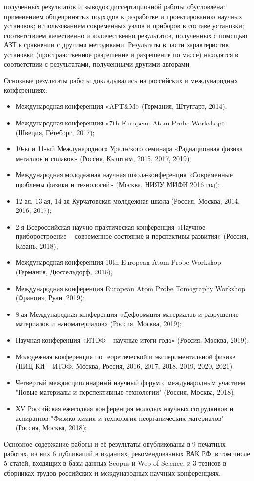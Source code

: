 {\reliability} полученных результатов и выводов диссертационной работы обусловлена: применением общепринятых подходов к разработке и проектированию научных установок; использованием современных узлов и приборов в составе установки; соответствием качественно и количественно результатов, полученных с помощью АЗТ в сравнении с другими методиками. Результаты в части характеристик установки (пространственное разрешение и разрешение по массе) находятся в соответствии с результатами, полученными другими авторами.


{\probation}
Основные результаты работы докладывались на российских и международных конференциях:
\begin{itemize}
	\item Международная конференция «APT$\&$M» (Германия, Штутгарт, 2014);
	\item Международная конференция «7th European Atom Probe Workshop» (Швеция, Гётеборг, 2017);
	\item 10-ы и 11-ый Международного Уральского семинара «Радиационная физика металлов и сплавов» (Россия, Кыштым, 2015, 2017, 2019);
	\item Международная молодежная научная школа-конференция «Современные проблемы физики и технологий» (Москва, НИЯУ МИФИ 2016 год);
	\item 12-ая, 13-ая, 14-ая Курчатовская молодежная школа (Россия, Москва, 2014, 2016, 2017);
	\item 2-я Всероссийская научно-практическая конференция «Научное приборостроение – современное состояние и перспективы развития» (Россия, Казань, 2018);
	\item Международная конференция 10th European Atom Probe Workshop (Германия, Дюссельдорф, 2018);
	\item Международная конференция European Atom Probe Tomography Workshop (Франция, Руан, 2019);
	\item 8-ая Международная конференция «Деформация материалов и разрушение материалов и наноматериалов» (Россия, Москва, 2019); 
	\item Научная конференция «ИТЭФ – научные итоги года» (Россия, Москва, 2019);
	\item Молодежная конференция по теоретической и экспериментальной физике (НИЦ КИ – ИТЭФ, Москва, Россия, 2016, 2017, 2018, 2019, 2020, 2021);
	\item Четвертый междисциплинарный научный форум с международным участием "Новые материалы и перспективные технологии" (Россия, Москва, 2018);
	\item ХV Российская ежегодная конференция молодых научных сотрудников и аспирантов "Физико-химия и технология неорганических материалов" (Россия, Москва, 2018);
	
\end{itemize}
Основное содержание работы и её результаты опубликованы в 9 печатных работах, из них 6 публикаций в изданиях, рекомендованных ВАК РФ, в том числе 5 статей, входящих в базы данных Scopus и Web of Science, и 3 тезисов в сборниках трудов российских и международных научных конференциях.

